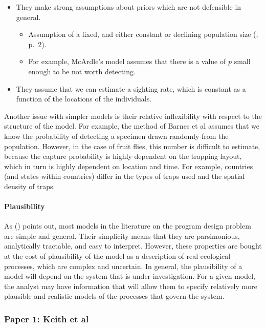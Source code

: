 \documentclass[
]{book}
\providecommand{\tightlist}{%
  \setlength{\itemsep}{0pt}\setlength{\parskip}{0pt}}
\begin{document}
\begin{itemize}
\tightlist
\item
  They make strong assumptions about priors which are not defensible in general.

  \begin{itemize}
  \tightlist
  \item
    Assumption of a fixed, and either constant or declining population size (\citet{caley2015}, p.~2).
  \item
    For example, McArdle's model assumes that there is a value of \(p\) small enough to be not worth detecting.
  \end{itemize}
\item
  They assume that we can estimate a sighting rate, which is constant as a function of the locations of the individuals.
\end{itemize}

Another issue with simpler models is their relative inflexibility with respect to the structure of the model. For example, the method of Barnes et al assumes that we know the probability of detecting a specimen drawn randomly from the population. However, in the case of fruit flies, this number is difficult to estimate, because the capture probability is highly dependent on the trapping layout, which in turn is highly dependent on location and time. For example, countries (and states within countries) differ in the types of traps used and the spatial density of traps.

\hypertarget{plausibility}{%
\paragraph{Plausibility}\label{plausibility}}

As (\citet{caley2014}) points out, most models in the literature on the program design problem are simple and general. Their simplicity means that they are parsimonious, analytically tractable, and easy to interpret. However, these properties are bought at the cost of plausibility of the model as a description of real ecological processes, which are complex and uncertain. In general, the plausibility of a model will depend on the system that is under investigation. For a given model, the analyst may have information that will allow them to specify relatively more plausible and realistic models of the processes that govern the system.

\hypertarget{paper-1-keith-et-al}{%
\subsubsection{Paper 1: Keith et al}\label{paper-1-keith-et-al}}
\end{document}
